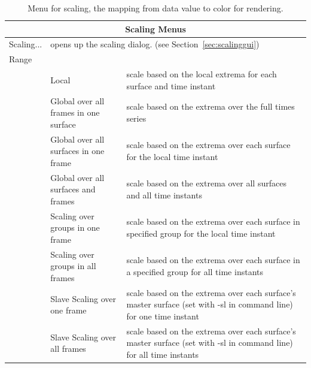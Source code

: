 \begin{table}[ht]
    \caption{Menu for scaling, the mapping from data value to color for
      rendering. }
\label{table:scaling}
  \begin{center}
    \begin{tabular}{|l|l|p{3 in}|} \hline
      \multicolumn{3}{|c|}{\textbf{Scaling Menus}} \\ \hline
    Scaling... & \multicolumn{2}{|l|}{opens up the scaling dialog.  (see
    Section~\ref{sec:scalinggui})} \\
    Range & & \\
    &  Local  & scale based on the local extrema for each surface and time
       instant \\
    &  Global over all frames in one surface  & scale based on the extrema 
        over the full times series \\ 
    &  Global over all surfaces in one frame & scale based on the extrema over 
        each surface for the local time instant\\
    &  Global over all surfaces and frames & scale based on the extrema
    over all surfaces 
       and all time instants\\
    &  Scaling over groups in one frame & scale based on the extrema over 
        each surface in specified group for the local time instant\\
    &  Scaling over groups in all frames & scale based on the extrema over 
        each surface in a specified group for all time instants\\
    &  Slave Scaling over one frame & scale based on the extrema over 
        each surface's master surface (set with -sl in command line)
        for one time instant\\
    &  Slave Scaling over all frames & scale based on the extrema over 
        each surface's master surface (set with -sl in command line)
        for all time instants\\ \hline


\end{tabular}
\end{center}
\end{table}

